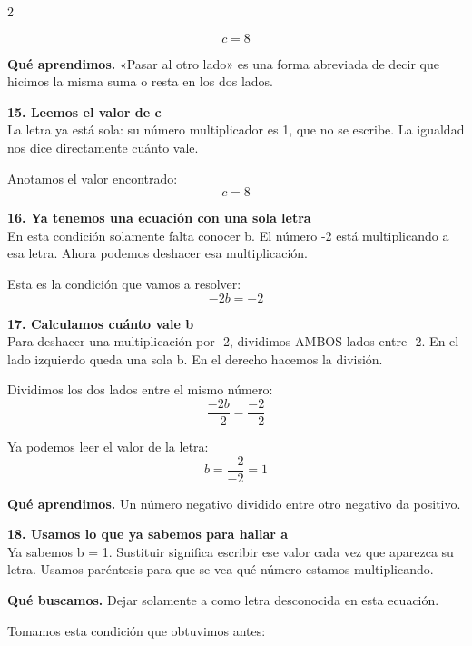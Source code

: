 \documentclass[11pt,a4paper,landscape]{article}
\begin{document}
\begin{multicols*}{2}
\begin{minipage}{\linewidth}
\[c=8\]
\par\smallskip\textbf{Qué aprendimos.} «Pasar al otro lado» es una forma abreviada de decir que hicimos la misma suma o resta en los dos lados.
\end{minipage}\par\medskip
\noindent\begin{minipage}{\linewidth}\textbf{15. Leemos el valor de c}\\[2pt]La letra ya está sola: su número multiplicador es 1, que no se escribe. La igualdad nos dice directamente cuánto vale.
\par\smallskip Anotamos el valor encontrado:
\[c=8\]
\end{minipage}\par\medskip
\noindent\begin{minipage}{\linewidth}\textbf{16. Ya tenemos una ecuación con una sola letra}\\[2pt]En esta condición solamente falta conocer b. El número -2 está multiplicando a esa letra. Ahora podemos deshacer esa multiplicación.
\par\smallskip Esta es la condición que vamos a resolver:
\[-2b = -2\]
\end{minipage}\par\medskip
\noindent\begin{minipage}{\linewidth}\textbf{17. Calculamos cuánto vale b}\\[2pt]Para deshacer una multiplicación por -2, dividimos AMBOS lados entre -2. En el lado izquierdo queda una sola b. En el derecho hacemos la división.
\par\smallskip Dividimos los dos lados entre el mismo número:
\[\frac{-2b}{-2}=\frac{-2}{-2}\]
\par\smallskip Ya podemos leer el valor de la letra:
\[b=\frac{-2}{-2}=1\]
\par\smallskip\textbf{Qué aprendimos.} Un número negativo dividido entre otro negativo da positivo.
\end{minipage}\par\medskip
\noindent\begin{minipage}{\linewidth}\textbf{18. Usamos lo que ya sabemos para hallar a}\\[2pt]Ya sabemos b = 1. Sustituir significa escribir ese valor cada vez que aparezca su letra. Usamos paréntesis para que se vea qué número estamos multiplicando.
\par\smallskip\textbf{Qué buscamos.} Dejar solamente a como letra desconocida en esta ecuación.
\par\smallskip Tomamos esta condición que obtuvimos antes:

\end{minipage}
\end{multicols*}
\end{document}
